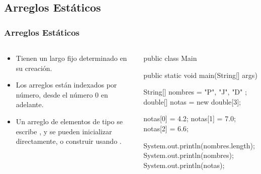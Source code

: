 \documentclass{beamer}
\begin{document}
\subsection{Arreglos Estáticos}

\begin{frame}[fragile]
  \frametitle{Arreglos Estáticos}

  \begin{columns}
    \begin{column}{0.4\textwidth}
      \begin{small}
        \begin{itemize}
        \item Tienen un largo fijo determinado en su creación.
          
        \item Los arreglos están indexados por número, desde el número 0
          en adelante.
          
        \item Un arreglo de elementos de tipo  se escribe
          , y se pueden inicializar directamente, o construir
          usando .
          
        \end{itemize}
      \end{small}
    \end{column}
    \begin{column}{0.6\textwidth}
      
      \begin{jsmall}
        public class Main {
          public static void main(String[] args) {

            String[] nombres = { "P", "J", "D" };
            double[] notas   = new double[3];

            notas[0] = 4.2;
            notas[1] = 7.0;
            notas[2] = 6.6;

            System.out.println(nombres.length);
            System.out.println(nombres);
            System.out.println(notas);
          }
        }
      \end{jsmall}
      
    \end{column}
  \end{columns}

\end{frame}
\end{document}
